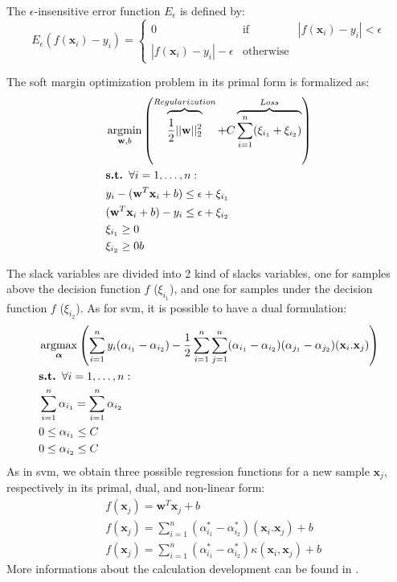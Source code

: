 \noindent The $\epsilon$-insensitive error function $E_{\epsilon}$ is defined by:
\begin{equation}
E_{\epsilon} (f(\textbf{x}_i)-y_i) =
\left\lbrace
\begin{array}{lll}
0  								& \mbox{if} 		& |f(\textbf{x}_i)-y_i| < \epsilon\\
|f(\textbf{x}_i)-y_i|-\epsilon 	& \mbox{otherwise}  & 
\end{array}\right.
\end{equation}


\noindent The soft margin optimization problem in its primal form is formalized as:
	\begin{align}
		& \argmin_{\textbf{w},b}  \left( 
		\overbrace{\vphantom{\sum_{i=1}^n \xi_i}
			\frac{1}{2}||\textbf{w}||^2_2}^{Regularization}
		+ C \overbrace{\sum\limits_{i=1}^{n}(\xi_{i_1}+\xi_{i_2})}^{Loss}
		\right) 
		\label{eq:objectiveSVR}\\
		& \textbf{s.t. } \forall i=1, \ldots, n: \nonumber\\
		& y_i-(\textbf{w}^T\textbf{x}_i+b) \leq \epsilon +\xi_{i_1} \\
		& (\textbf{w}^T\textbf{x}_i+b)-y_i \leq \epsilon +\xi_{i_2} \\
		&  \xi_{i_1} \geq 0 \\
		&  \xi_{i_2} \geq 0
b 	\end{align}

\noindent The slack variables are divided into 2 kind of slacks variables, one for samples above the decision function $f$ ($\xi_{i_1}$), and one for samples under the decision function $f$ ($\xi_{i_2}$). As for {\sc svm}, it is possible to have a dual formulation:
	\begin{align}
		& \argmax_{\boldsymbol{\alpha}} 
		\left( 
		\sum\limits_{i=1}^{n} y_i(\alpha_{i_1}-\alpha_{i_2})
		-\frac{1}{2} \sum\limits_{i=1}^{n} \sum\limits_{j=1}^{n} (\alpha_{i_1}-\alpha_{i_2})(\alpha_{j_1}-\alpha_{j_2}) (\textbf{x}_i.\textbf{x}_j)
		\right) \\ 
		& \textbf{s.t. } \forall i=1, \ldots, n: \nonumber\\
		& \sum\limits_{i=1}^{n} \alpha_{i_1} = \sum\limits_{i=1}^{n} \alpha_{i_2} \\
		& 0 \leq \alpha_{i_1} \leq C \\
		& 0 \leq \alpha_{i_2} \leq C
	\end{align}
\noindent As in {\sc svm}, we obtain three possible regression functions for a new sample $\textbf{x}_j$, respectively in its primal, dual, and non-linear form:
\begin{align}
	& f(\textbf{x}_j) = \textbf{w}^T\textbf{x}_j+b \\ 
	& f(\textbf{x}_j) = \sum\limits_{i=1}^{n} (\alpha_{i_1}^*-\alpha_{i_2}^*)(\textbf{x}_i.\textbf{x}_j) + b \\	
	& f(\textbf{x}_j) = \sum\limits_{i=1}^{n} (\alpha_{i_1}^*-\alpha_{i_2}^*)\kappa(\textbf{x}_i,\textbf{x}_j) + b
\end{align}	
More informations about the calculation development can be found in \cite{Bishop2006}.

